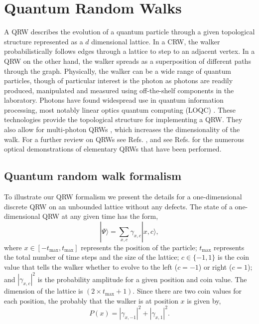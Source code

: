 \documentclass[aps,pra,twocolumn,amsmath,amssymb,nofootinbib,superscriptaddress]{revtex4}
\newcommand{\ket}[1]{|#1\rangle}
\begin{document}
\section{Quantum Random Walks}
A QRW describes the evolution of a quantum particle through a given topological structure represented as a $d$ dimensional lattice. In a CRW, the walker probabilistically follows edges through a lattice to step to an adjacent vertex. In a QRW on the other hand, the walker spreads as a superposition of different paths through the graph. Physically, the walker can be a wide range of quantum particles, though of particular interest is the photon as photons are readily produced, manipulated and measured using off-the-shelf components in the laboratory. Photons have found widespread use in quantum information processing, most notably linear optics quantum computing (LOQC) \cite{bib:KLM01}. These technologies provide the topological structure for implementing a QRW. They also allow for multi-photon QRWs \cite{bib:increasing12}, which increases the dimensionality of the walk. For a further review on QRWs see Refs. \cite{bib:ADZ, bib:AAKV, bib:Kempe08, bib:Salvador12}, and see Refs. \cite{bib:Hagai08, bib:Schreiber10, bib:Broome10, bib:Peruzzo10, bib:Schreiber11b, bib:Matthews11, bib:Owens11, bib:Schreiber12, Sansoni12} for the numerous optical demonstrations of elementary QRWs that have been performed.
  
\subsection{Quantum random walk formalism}
To illustrate our QRW formalism we present the details for a one-dimensional discrete QRW on an unbounded lattice without any defects. The state of a one-dimensional QRW at any given time has the form,
\begin{equation} \label{eq:State}
\ket{\Psi}=\sum_{x, c} \gamma_{x,c} \ket{x, c},
\end{equation}
where $x \in [-t_\mathrm{max},t_\mathrm{max}]$ represents the position of the particle; $t_\mathrm{max}$ represents the total number of time steps and the size of the lattice; $c \in \{-1,1\}$ is the coin value that tells the walker whether to evolve to the left ($c=-1$) or right ($c=1$); and $|\gamma_{x,c}|^{2}$ is the probability amplitude for a given position and coin value. The dimension of the lattice is $(2\times t_\mathrm{max}+1)$. Since there are two coin values for each position, the probably that the walker is at position $x$ is given by,
\begin{equation} \label{eq:probX}
P(x)=|\gamma_{x,-1}|^{2}+|\gamma_{x,1}|^{2}.
\end{equation}
\end{document}
